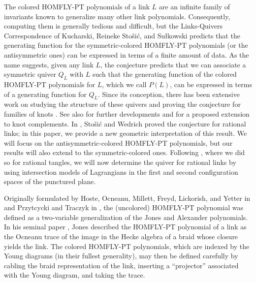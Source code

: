 \documentclass[11pt]{amsart}
\theoremstyle{plain}
\theoremstyle{definition}
\theoremstyle{remark}
\begin{document}
The colored HOMFLY-PT polynomials of a link $L$ are an infinite family of invariants known to generalize many other link polynomials. Consequently, computing them is generally tedious and difficult, but the Links-Quivers Correspondence of Kucharski, Reineke Sto\v si\'c, and Sułkowski \cite{KRSS17,K19} predicts that the generating function for the symmetric-colored HOMFLY-PT polynomials (or the antisymmetric ones) can be expressed in terms of a finite amount of data. As the name suggests, given any link $L$, the conjecture predicts that we can associate a symmetric quiver $Q_L$ with $L$ such that the generating function of the colored HOMFLY-PT polynomials for $L$, which we call $P(L)$, can be expressed in terms of a generating function for $Q_L$. Since its conception, there has been extensive work on studying the structure of these quivers \cite{CKNPSS25,EKL20,JKLN21,KLNS26} and proving the conjecture for families of knots \cite{SW21,SW21ii}. See also \cite{EKL23,JGKM23,KRSS20,PSS18,SS25} for further developments and \cite{EGGKPSS22,K20} for a proposed extension to knot complements. In \cite{SW21}, Sto\v si\'c and Wedrich proved the conjecture for rational links; in this paper, we provide a new geometric interpretation of this result. We will focus on the antisymmetric-colored HOMFLY-PT polynomials, but our results will also extend to the symmetric-colored ones. Following \cite{JHpI26}, where we did so for rational tangles, we will now determine the quiver for rational links by using intersection models of Lagrangians in the first and second configuration spaces of the punctured plane. 

Originally formulated by Hoste, Ocneanu, Millett, Freyd, Lickorish, and Yetter in \cite{HOMFLY85} and Przytcycki and Traczyk in \cite{PT87}, the (uncolored) HOMFLY-PT polynomial was defined as a two-variable generalization of the Jones and Alexander polynomials. In his seminal paper \cite{J87}, Jones described the HOMFLY-PT polynomial of a link as the Ocneanu trace of the image in the Hecke algebra of a braid whose closure yields the link. The colored HOMFLY-PT polynomials, which are indexed by the Young diagrams (in their fullest generality), may then be defined carefully by cabling the braid representation of the link, inserting a ``projector'' associated with the Young diagram, and taking the trace.
\end{document}
